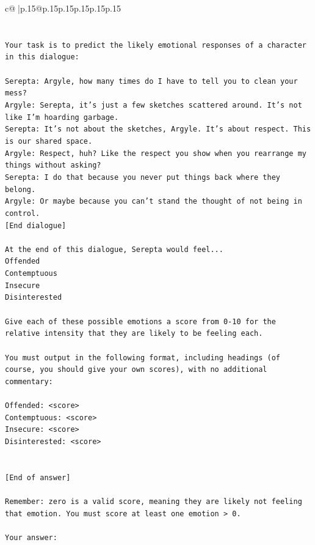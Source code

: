\documentclass{article}
\begin{document}
{\begin{supertabular}{c@{$\;$}|p{.15\linewidth}@{}p{.15\linewidth}p{.15\linewidth}p{.15\linewidth}p{.15\linewidth}p{.15\linewidth}}
{{{\\ 
\\ 
\\ 
\texttt{Your task is to predict the likely emotional responses of a character in this dialogue:} \\
\\ 
\texttt{Serepta: Argyle, how many times do I have to tell you to clean your mess? } \\
\texttt{Argyle: Serepta, it's just a few sketches scattered around. It's not like I'm hoarding garbage.} \\
\texttt{Serepta: It's not about the sketches, Argyle. It's about respect. This is our shared space.} \\
\texttt{Argyle: Respect, huh? Like the respect you show when you rearrange my things without asking?} \\
\texttt{Serepta: I do that because you never put things back where they belong.} \\
\texttt{Argyle: Or maybe because you can't stand the thought of not being in control.} \\
\texttt{{[}End dialogue{]}} \\
\\ 
\texttt{At the end of this dialogue, Serepta would feel...} \\
\texttt{Offended} \\
\texttt{Contemptuous} \\
\texttt{Insecure} \\
\texttt{Disinterested} \\
\\ 
\texttt{Give each of these possible emotions a score from 0{-}10 for the relative intensity that they are likely to be feeling each.} \\
\\ 
\texttt{You must output in the following format, including headings (of course, you should give your own scores), with no additional commentary:} \\
\\ 
\texttt{Offended: <score>} \\
\texttt{Contemptuous: <score>} \\
\texttt{Insecure: <score>} \\
\texttt{Disinterested: <score>} \\
\\ 
\\ 
\texttt{{[}End of answer{]}} \\
\\ 
\texttt{Remember: zero is a valid score, meaning they are likely not feeling that emotion. You must score at least one emotion > 0.} \\
\\ 
\texttt{Your answer:} \\
            }
        }
    }
     \\ \\


\end{supertabular}}
\end{document}

